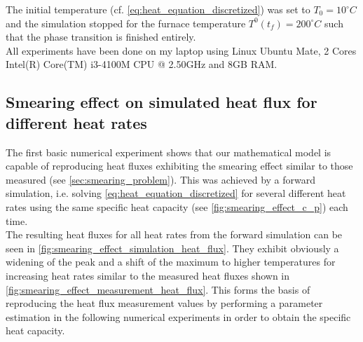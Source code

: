 \documentclass{scrartcl}[12pt, halfparskip]
\numberwithin{equation}{section}
\numberwithin{figure}{section}
\numberwithin{table}{section}
\begin{document}
The initial temperature (cf. \cref{eq:heat_equation_discretized}) was set to $T_0=10^\circ C$ and the simulation stopped for the furnace temperature $T^0(t_f)=200^\circ C$ such that the phase transition is finished entirely. \\


All experiments have been done on my laptop using Linux Ubuntu Mate, 2 Cores Intel(R) Core(TM) i3-4100M CPU @ 2.50GHz and 8GB RAM. 


\subsection{Smearing effect on simulated heat flux for different heat rates}
The first basic numerical experiment shows that our mathematical model is capable of reproducing heat fluxes exhibiting the smearing effect similar to those measured (see \cref{sec:smearing_problem}). This was achieved by a forward simulation, i.e. solving \cref{eq:heat_equation_discretized} for several different heat rates using the same specific heat capacity (see \cref{fig:smearing_effect_c_p}) each time. \\
The resulting heat fluxes for all heat rates from the forward simulation can be seen in \cref{fig:smearing_effect_simulation_heat_flux}. They exhibit obviously a widening of the peak and a shift of the maximum to higher temperatures for increasing heat rates similar to the measured heat fluxes shown in \cref{fig:smearing_effect_measurement_heat_flux}. This forms the basis of reproducing the heat flux measurement values by performing a parameter estimation in the following numerical experiments in order to obtain the specific heat capacity.\\
\end{document}
